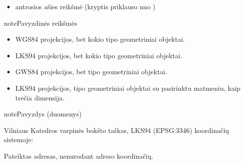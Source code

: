 \documentclass[letterpaper,10pt,lithuanian]{sphinxmanual}
\begin{document}
\begin{fulllineitems}
\begin{itemize}
\item {} 
\sphinxAtStartPar
{} \sphinxhyphen{} antrosios ašies reikšmė (kryptis priklauso nuo )

\end{itemize}

\begin{sphinxadmonition}{note}{Pavyzdinės  reikšmės}
\begin{itemize}
\item {} 
\sphinxAtStartPar
{} \sphinxhyphen{} WGS84 projekcijos, bet kokio  tipo geometriniai
objektai.

\item {} 
\sphinxAtStartPar
{} \sphinxhyphen{} LKS94 projekcijos, bet kokio tipo geometriniai
objektai.

\item {} 
\sphinxAtStartPar
{} \sphinxhyphen{} GWS84 projekcijos, bet  tipo geometriniai
objektai.

\item {} 
\sphinxAtStartPar
{} \sphinxhyphen{} LKS94 projekcijos,  tipo
geometriniai objektai su pasirinktu matmeniu, kaip trečia dimensija.

\end{itemize}
\end{sphinxadmonition}

\begin{sphinxadmonition}{note}{Pavyzdys (duomenys)}

\sphinxAtStartPar
Vilniaus Katedros varpinės bokšto taškas, LKS94 (EPSG:3346) koordinačių
sistemoje:

\begin{sphinxVerbatim}[commandchars=\\\{\}]
\end{sphinxVerbatim}
\end{sphinxadmonition}

\begin{sphinxShadowBox}
\begin{description}
\sphinxAtStartPar
Pateiktas adresas, nenurodant adreso koordinačių.


\end{description}
\end{sphinxShadowBox}
\end{fulllineitems}
\end{document}
